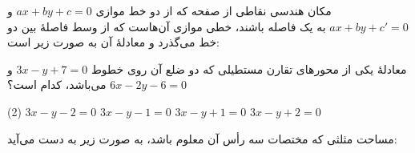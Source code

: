 \begin{remark}
    مکان هندسی نقاطی از صفحه که از دو خط موازی
    \(ax+by+c=0\) و \(ax+by+c'=0\)
    به یک فاصله باشند، خطی موازی آن‌هاست که از
    وسط فاصلۀ بین دو خط می‌گذرد و معادلۀ آن
    به صورت زیر است:
\end{remark}

\begin{center}
\end{center}


\begin{example}
    معادلۀ یکی از محورهای تقارن مستطیلی که دو ضلع آن
    روی خطوط
    \(3x-y+7=0\) و \(6x-2y-6=0\)
    می‌باشد، کدام است؟

    \begin{tasks}(2)
        \task \(3x-y-2=0\)
        \task \(3x-y-1=0\)
        \task \(3x-y+1=0\)
        \task \(3x-y+2=0\)
    \end{tasks}
\end{example}


\begin{remark}
    مساحت مثلثی که مختصات سه رأس آن معلوم باشد،
    به صورت زیر به دست می‌آید:
\end{remark}

